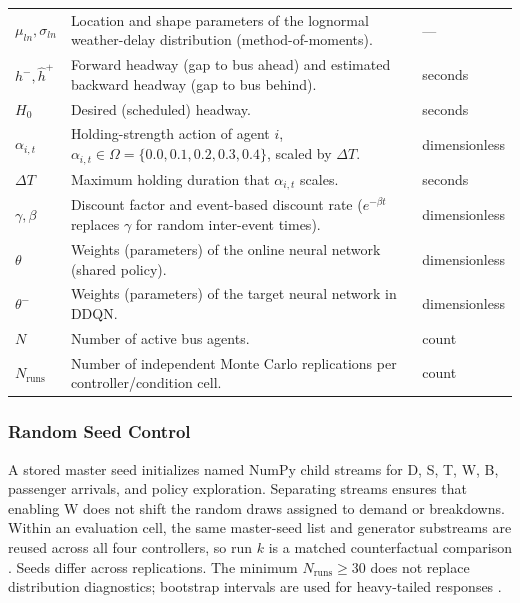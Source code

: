 \begin{table}[htbp]
\begin{tabularx}{\textwidth}{
>{\RaggedRight\arraybackslash}p{}
>{\RaggedRight\arraybackslash}X
>{\RaggedRight\arraybackslash}p{}
}
$\mu_{ln},\sigma_{ln}$ &
Location and shape parameters of the lognormal weather-delay distribution (method-of-moments). &
--- \\

$h^-,\hat{h}^+$ &
Forward headway (gap to bus ahead) and estimated backward headway (gap to bus behind). &
seconds \\

$H_0$ &
Desired (scheduled) headway. &
seconds \\

$\alpha_{i,t}$ &
Holding-strength action of agent $i$, $\alpha_{i,t}\in\Omega=\{0.0,0.1,0.2,0.3,0.4\}$, scaled by $\Delta T$. &
dimensionless \\

$\Delta T$ &
Maximum holding duration that $\alpha_{i,t}$ scales. &
seconds \\

$\gamma,\beta$ &
Discount factor and event-based discount rate ($e^{-\beta t}$ replaces $\gamma$ for random inter-event times). &
dimensionless \\

$\theta$ &
Weights (parameters) of the online neural network (shared policy). &
dimensionless \\

$\theta^-$ &
Weights (parameters) of the target neural network in DDQN. &
dimensionless \\

$N$ &
Number of active bus agents. &
count \\

$N_{\mathrm{runs}}$ &
Number of independent Monte Carlo replications per controller/condition cell. &
count \\

\bottomrule
\end{tabularx}
\end{table}

\subsubsection{Random Seed Control}

A stored master seed initializes named NumPy child streams for D, S, T, W, B, passenger arrivals, and policy exploration. Separating streams ensures that enabling W does not shift the random draws assigned to demand or breakdowns. Within an evaluation cell, the same master-seed list and generator substreams are reused across all four controllers, so run $k$ is a matched counterfactual comparison \cite{Henderson2018Matters}. Seeds differ across replications. The minimum $N_{\mathrm{runs}}\geq30$ does not replace distribution diagnostics; bootstrap intervals are used for heavy-tailed responses \cite{Agarwal2021Precipice}.

